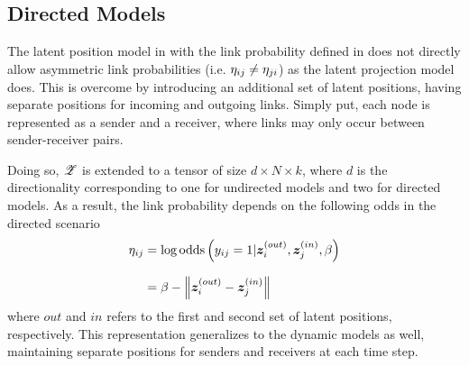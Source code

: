 \subsection{Directed Models}\label{sec:mdev-directed}

    The latent position model in  with the link probability defined in  does not directly allow asymmetric link probabilities (i.e. $\sub(\eta)\neq\sub(\eta)(ji)$) as the latent projection model does.
    This is overcome by introducing an additional set of latent positions, having separate positions for incoming and outgoing links. Simply put, each node is represented as a sender and a receiver, where links may only occur between sender-receiver pairs.
    
    Doing so, $\bm{\mathscr{Z}}$ is extended to a tensor of size $d\times N\times k$, where $d$ is the directionality corresponding to one for undirected models and two for directed models. As a result, the link probability depends on the following odds in the directed scenario
    \begin{equation}
        \begin{split}
            \sub(\eta)&=\log \odds\left(\sub(y)=1| \z_i^{(out)},\z_j^{(in)},\beta \right) \\[0.5\baselineskip]
            &= \beta - \left\Vert \z_i^{(out)} - \z_j^{(in)} \right\Vert
        \end{split}
    \end{equation}
    where $out$ and $in$ refers to the first and second set of latent positions, respectively.
    This representation generalizes to the dynamic models as well, maintaining separate positions for senders and receivers at each time step.